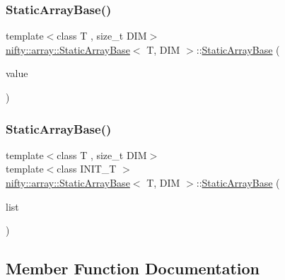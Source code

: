 \subsubsection{\texorpdfstring{Static\+Array\+Base()}{StaticArrayBase()}\hspace{0.1cm}{\footnotesize\ttfamily [2/3]}}
{\footnotesize\ttfamily template$<$class T , size\+\_\+t D\+IM$>$ \\
\hyperlink{classnifty_1_1array_1_1StaticArrayBase}{nifty\+::array\+::\+Static\+Array\+Base}$<$ T, D\+IM $>$\+::\hyperlink{classnifty_1_1array_1_1StaticArrayBase}{Static\+Array\+Base} (\begin{DoxyParamCaption}\item[{const T \&}]{value }\end{DoxyParamCaption})\hspace{0.3cm}{\ttfamily [inline]}}

\mbox{\label{classnifty_1_1array_1_1StaticArrayBase_a6d8d83f91ab1ba26d94d9a5915f98bb0}} 
\subsubsection{\texorpdfstring{Static\+Array\+Base()}{StaticArrayBase()}\hspace{0.1cm}{\footnotesize\ttfamily [3/3]}}
{\footnotesize\ttfamily template$<$class T , size\+\_\+t D\+IM$>$ \\
template$<$class I\+N\+I\+T\+\_\+T $>$ \\
\hyperlink{classnifty_1_1array_1_1StaticArrayBase}{nifty\+::array\+::\+Static\+Array\+Base}$<$ T, D\+IM $>$\+::\hyperlink{classnifty_1_1array_1_1StaticArrayBase}{Static\+Array\+Base} (\begin{DoxyParamCaption}\item[{const std\+::initializer\+\_\+list$<$ I\+N\+I\+T\+\_\+T $>$ \&}]{list }\end{DoxyParamCaption})\hspace{0.3cm}{\ttfamily [inline]}}



\subsection{Member Function Documentation}
\mbox{\label{classnifty_1_1array_1_1StaticArrayBase_ae9258cc672d2873aadc346d7c0cc0911}} 
